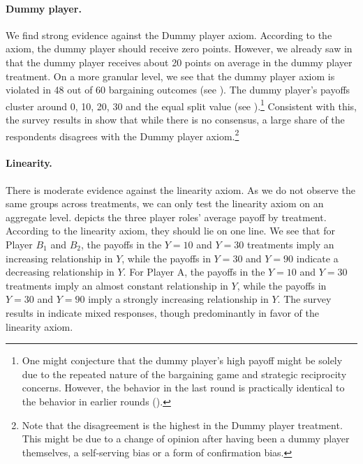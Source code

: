 \documentclass[12pt]{article}
\begin{document}
\paragraph{Dummy player.} We find strong evidence against the Dummy player axiom. According to the axiom, the dummy player should receive zero points. However, we already saw in  that the dummy player receives about 20 points on average in the dummy player treatment. On a more granular level, we see that the dummy player axiom is violated in 48 out of 60 bargaining outcomes (see ). The dummy player's payoffs cluster around 0, 10, 20, 30 and the equal split value (see ).\footnote{One might conjecture that the dummy player's high payoff might be solely due to the repeated nature of the bargaining game and strategic reciprocity concerns. However, the behavior in the last round is practically identical to the behavior in earlier rounds ().}
Consistent with this, the survey results in  show that while there is no consensus, a large share of the respondents disagrees with the Dummy player axiom.\footnote{Note that the disagreement is the highest in the Dummy player treatment. This might be due to a change of opinion after having been a dummy player themselves, a self-serving bias or a form of confirmation bias.} 

\paragraph{Linearity.}
There is moderate evidence against the linearity axiom. As we do not observe the same groups across treatments, we can only test the linearity axiom on an aggregate level.  depicts the three player roles' average payoff by treatment. According to the linearity axiom, they should lie on one line. We see that for Player $B_1$ and $B_2$, the payoffs in the $Y=10$ and $Y=30$ treatments imply an increasing relationship in $Y$, while the payoffs in $Y=30$ and $Y=90$ indicate a decreasing relationship in $Y$. For Player A, the payoffs in the $Y=10$ and $Y=30$ treatments imply an almost constant relationship in $Y$, while the payoffs in $Y=30$ and $Y=90$ imply a strongly increasing relationship in $Y$.
The survey results in  indicate mixed responses, though predominantly in favor of the linearity axiom.
\end{document}

